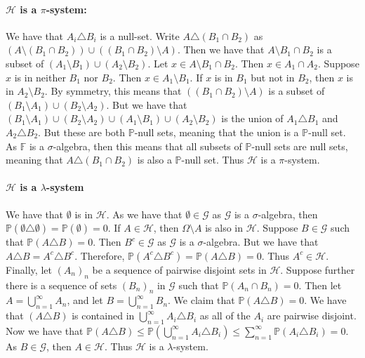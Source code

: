 \documentclass{article}
\theoremstyle{definition}
\numberwithin{theorem}{section}
\numberwithin{equation}{section}
\begin{document}
\paragraph{$\mathcal{H}$ is a $\pi$-system:}
We have that $A_i \triangle B_i$ is a null-set. Write $A \triangle (B_1 \cap B_2)$ as $\left(A \setminus (B_1 \cap B_2)\right) \cup \left((B_1 \cap B_2) \setminus A\right)$. Then we have that $A \setminus B_1 \cap B_2$ is a subset of $(A_1 \setminus B_1) \cup (A_2 \setminus B_2)$. Let $x \in A \setminus B_1 \cap B_2$. Then $x \in A_1 \cap A_2$. Suppose $x$ is in neither $B_1$ nor $B_2$. Then $x \in A_1 \setminus B_1$. If $x$ is in $B_1$ but not in $B_2$, then $x$ is in $A_2 \setminus B_2$. By symmetry, this means that $\left((B_1 \cap B_2) \setminus A\right)$ is a subset of $(B_1 \setminus A_1) \cup (B_2 \setminus A_2)$. But we have that $(B_1 \setminus A_1) \cup (B_2 \setminus A_2) \cup (A_1 \setminus B_1) \cup (A_2 \setminus B_2)$ is the union of $A_1 \triangle B_1$ and $A_2 \triangle B_2$. But these are both $\mathbb{P}$-null sets, meaning that the union is a $\mathbb{P}$-null set. As $\mathbb{F}$ is a $\sigma$-algebra, then this means that all subsets of $\mathbb{P}$-null sets are null sets, meaning that $A \triangle (B_1 \cap B_2)$ is also a $\mathbb{P}$-null set. Thus $\mathcal{H}$ is a $\pi$-system.

\paragraph{$\mathcal{H}$ is a $\lambda$-system}
We have that $\emptyset$ is in $\mathcal{H}$. As we have that $\emptyset \in \mathcal{G}$ as $\mathcal{G}$ is a $\sigma$-algebra, then $\mathbb{P}(\emptyset \triangle \emptyset) = \mathbb{P}(\emptyset) = 0$. If $A \in \mathcal{H}$, then $\Omega \setminus A$ is also in $\mathcal{H}$. Suppose $B \in \mathcal{G}$ such that $\mathbb{P}(A \triangle B) = 0$. Then $B^c \in \mathcal{G}$ as $\mathcal{G}$ is a $\sigma$-algebra. But we have that $A \triangle B = A^c \triangle B^c$. Therefore, $\mathbb{P}(A^c \triangle B^c) = \mathbb{P}(A \triangle B) = 0$. Thus $A^c \in \mathcal{H}$. Finally, let $(A_n)_n$ be a sequence of pairwise disjoint sets in $\mathcal{H}$. Suppose further there is a sequence of sets $(B_n)_n$ in $\mathcal{G}$ such that $\mathbb{P}(A_n \cap B_n) = 0$. Then let $A = \bigcup_{n = 1}^\infty A_n$, and let $B = \bigcup_{n = 1}^\infty B_n$. We claim that $\mathbb{P}(A \triangle B) = 0$. We have that $(A \triangle B)$ is contained in $\bigcup_{n = 1}^\infty A_i \triangle B_i$ as all of the $A_i$ are pairwise disjoint. Now we have that $\mathbb{P}(A \triangle B) \leq \mathbb{P}(\bigcup_{n = 1}^\infty A_i \triangle B_i) \leq \sum_{n = 1}^{\infty}\mathbb{P}(A_i \triangle B_i) = 0$. As $B \in \mathcal{G}$, then $A \in \mathcal{H}$. Thus $\mathcal{H}$ is a $\lambda$-system.
\end{document}
